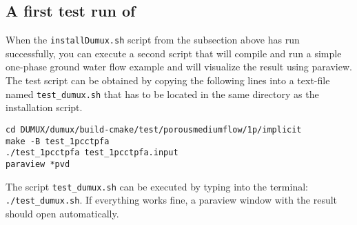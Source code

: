 \subsection{A first test run of \Dumux}
When the \texttt{installDumux.sh} script from the subsection above has run successfully, you can execute a second script that
will compile and run a simple one-phase ground water flow example and will visualize the result using paraview.
The test script can be obtained by copying the following lines into a text-file named \texttt{test\_dumux.sh}
that has to be located in the same directory as the installation script.
\begin{lstlisting}[style=DumuxCode]
cd DUMUX/dumux/build-cmake/test/porousmediumflow/1p/implicit
make -B test_1pcctpfa
./test_1pcctpfa test_1pcctpfa.input
paraview *pvd
\end{lstlisting}
The script \texttt{test\_dumux.sh} can be executed by typing into the terminal: \texttt{./test\_dumux.sh}.
If everything works fine, a paraview window with the result should open automatically.
